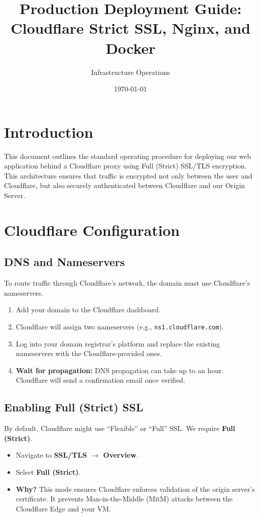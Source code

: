 \documentclass[12pt,a4paper]{article}
\title{\textbf{Production Deployment Guide:\\ Cloudflare Strict SSL, Nginx, and Docker}}
\author{Infrastructure Operations}
\date{\today}
\begin{document}
\maketitle

\tableofcontents

\section{Introduction}
This document outlines the standard operating procedure for deploying our web application behind a Cloudflare proxy using Full (Strict) SSL/TLS encryption. This architecture ensures that traffic is encrypted not only between the user and Cloudflare, but also securely authenticated between Cloudflare and our Origin Server.

\section{Cloudflare Configuration}

\subsection{DNS and Nameservers}
To route traffic through Cloudflare's network, the domain must use Cloudflare's nameservers.
\begin{enumerate}
    \item Add your domain to the Cloudflare dashboard.
    \item Cloudflare will assign two nameservers (e.g., \texttt{ns1.cloudflare.com}).
    \item Log into your domain registrar's platform and replace the existing nameservers with the Cloudflare-provided ones.
    \item \textbf{Wait for propagation:} DNS propagation can take up to an hour. Cloudflare will send a confirmation email once verified.
\end{enumerate}

\subsection{Enabling Full (Strict) SSL}
By default, Cloudflare might use ``Flexible'' or ``Full'' SSL. We require \textbf{Full (Strict)}.
\begin{itemize}
    \item Navigate to \textbf{SSL/TLS $\rightarrow$ Overview}.
    \item Select \textbf{Full (Strict)}. 
    \item \textbf{Why?} This mode ensures Cloudflare enforces validation of the origin server's certificate. It prevents Man-in-the-Middle (MitM) attacks between the Cloudflare Edge and your VM.
\end{itemize}
\end{document}
